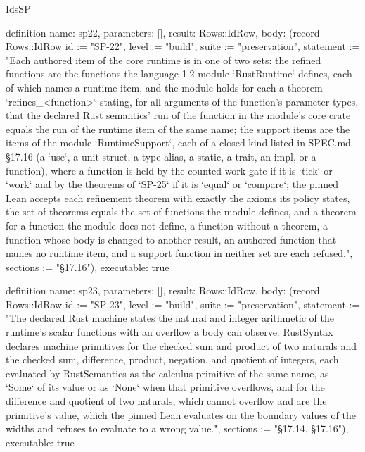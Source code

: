 \begin{lexlean}{IdsSP}
\begin{semanticmodule}
definition{
  name: sp22,
  parameters: [],
  result: Rows::IdRow,
  body: (record Rows::IdRow {id := "SP-22", level := "build", suite := "preservation", statement := "Each authored item of the core runtime is in one of two sets: the refined functions are the functions the language-1.2 module `RustRuntime` defines, each of which names a runtime item, and the module holds for each a theorem `refines_<function>` stating, for all arguments of the function's parameter types, that the declared Rust semantics' run of the function in the module's core crate equals the run of the runtime item of the same name; the support items are the items of the module `RuntimeSupport`, each of a closed kind listed in SPEC.md §17.16 (a `use`, a unit struct, a type alias, a static, a trait, an impl, or a function), where a function is held by the counted-work gate if it is `tick` or `work` and by the theorems of `SP-25` if it is `equal` or `compare`; the pinned Lean accepts each refinement theorem with exactly the axioms its policy states, the set of theorems equals the set of functions the module defines, and a theorem for a function the module does not define, a function without a theorem, a function whose body is changed to another result, an authored function that names no runtime item, and a support function in neither set are each refused.", sections := "§17.16"}),
  executable: true
}

definition{
  name: sp23,
  parameters: [],
  result: Rows::IdRow,
  body: (record Rows::IdRow {id := "SP-23", level := "build", suite := "preservation", statement := "The declared Rust machine states the natural and integer arithmetic of the runtime's scalar functions with an overflow a body can observe: RustSyntax declares machine primitives for the checked sum and product of two naturals and the checked sum, difference, product, negation, and quotient of integers, each evaluated by RustSemantics as the calculus primitive of the same name, as `Some` of its value or as `None` when that primitive overflows, and for the difference and quotient of two naturals, which cannot overflow and are the primitive's value, which the pinned Lean evaluates on the boundary values of the widths and refuses to evaluate to a wrong value.", sections := "§17.14, §17.16"}),
  executable: true
}


\end{semanticmodule}
\end{lexlean}
